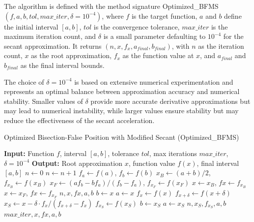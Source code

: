 \documentclass[amsmath, amssymb, aps]{revtex4-2}
\begin{document}
The algorithm is defined with the method signature Optimized\_BFMS$(f, a, b, tol, max\_iter, \delta = 10^{-4})$, where $f$ is the target function, $a$ and $b$ define the initial interval $[a, b]$, $tol$ is the convergence tolerance, $max\_iter$ is the maximum iteration count, and $\delta$ is a small parameter defaulting to $10^{-4}$ for the secant approximation. It returns $(n, x, f_x, a_{final}, b_{final})$, with $n$ as the iteration count, $x$ as the root approximation, $f_x$ as the function value at $x$, and $a_{final}$ and $b_{final}$ as the final interval bounds.

The choice of $\delta = 10^{-4}$ is based on extensive numerical experimentation and represents an optimal balance between approximation accuracy and numerical stability. Smaller values of $\delta$ provide more accurate derivative approximations but may lead to numerical instability, while larger values ensure stability but may reduce the effectiveness of the secant acceleration.

\begin{algorithm}[H]
\caption{Optimized Bisection-False Position with Modified Secant (Optimized\_BFMS)}
\begin{algorithmic}[1]
\State \textbf{Input:} Function $f$, interval $[a, b]$, tolerance $tol$, max iterations $max\_iter$, $\delta = 10^{-4}$
\State \textbf{Output:} Root approximation $x$, function value $f(x)$, final interval $[a, b]$
\State $n \gets 0$
    \State $n \gets n + 1$
    \State $f_a \gets f(a)$, $f_b \gets f(b)$
    \State $x_B \gets (a + b)/2$, $f_{x_B} \gets f(x_B)$
    \State $x_F \gets (a f_b - b f_a)/(f_b - f_a)$, $f_{x_F} \gets f(x_F)$
        \State $x \gets x_B$, $fx \gets f_{x_B}$
    \Else
        \State $x \gets x_F$, $fx \gets f_{x_F}$
    \EndIf
        \State \Return $n, x, fx, a, b$
    \EndIf
        \State $b \gets x$
    \Else
        \State $a \gets x$
    \EndIf
    \State $f_x \gets f(x)$
    \State $f_{x+\delta} \gets f(x + \delta)$
    \State $x_S \gets x - \delta \cdot f_x / (f_{x+\delta} - f_x)$
        \State $f_{x_S} \gets f(x_S)$
                \State $b \gets x_S$
            \Else
                \State $a \gets x_S$
            \EndIf
                \State \Return $n, x_S, f_{x_S}, a, b$
            \EndIf
        \EndIf
    \EndIf
\EndWhile
\State \Return $max\_iter, x, fx, a, b$
\end{algorithmic}
\end{algorithm}
\end{document}
